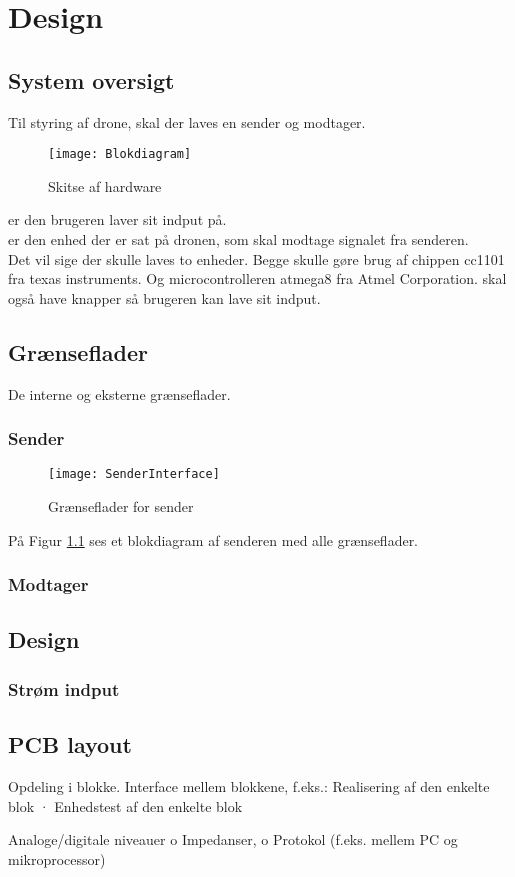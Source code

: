 \documentclass[Main]{subfiles}
\begin{document}
\chapter{Design}

\section{System oversigt}

Til styring af drone, skal der laves en sender og modtager.

\begin{figure}[H]
\centering
\texttt{[image: Blokdiagram]}
\caption{Skitse af hardware}
\end{figure}

 er den brugeren laver sit indput på. 
\\  er den enhed der er sat på dronen, som skal modtage signalet fra senderen.\\
Det vil sige der skulle laves to enheder. Begge skulle gøre brug af chippen cc1101 fra texas instruments. Og microcontrolleren atmega8 fra Atmel Corporation.
 skal også have knapper så brugeren kan lave sit indput.

\section{Grænseflader}

De interne og eksterne grænseflader. 

\subsection{Sender}
\begin{figure}[H]
\centering
\texttt{[image: SenderInterface]}
\caption{Grænseflader for sender}
\label{fig: SenderInterface}
\end{figure}

På Figur \ref{fig: SenderInterface} ses et blokdiagram af senderen med alle grænseflader.


\subsection{Modtager}

\itoc

\section{Design}

\subsection{Strøm indput}

\section{PCB layout}



Opdeling i blokke.
Interface mellem blokkene, f.eks.:
Realisering af den enkelte blok
· Enhedstest af den enkelte blok

Analoge/digitale niveauer
o Impedanser,
o Protokol (f.eks. mellem PC og mikroprocessor)
\end{document}
